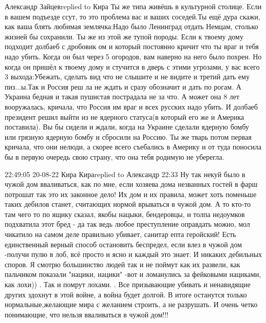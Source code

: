 Александр Зайцевreplied to Кира
Ты же типа живёшь в культурной столице. Если в вашем подъезде ссут, то это проблема вас и ваших соседей.Ты ещё дура скажи, как ваша блять любимая землячка:Надо было Ленинград отдать Немцам, столько жизней бы сохранили. Ты же из этой же тупой породы. Если к твоему дому подходит долбаеб с дробовик ом и который постоянно кричит что ты враг и тебя надо убить. Когда он был через 5 огородов, вам наверно на него было похрен. Но когда он пришёл к твоему дому и стучится в дверь с этими угрозами, у вас всего 3 выхода:Убежать, сделать вид что не слышите и не видите и третий дать ему пиз...ы.Так и Россия реш ла не ждать и сразу обозначит и дать по рогам. А Украина бедная и такая пушистая пострадала не за что. А может она 8 лет вооружалась, кричала, что Россия им враг и всех русских надо убить. И долбаеб президент решил выйти из не ядерного статуса(в который его же и Америка поставила). Вы бы сидели и ждали, когда на Украине сделали ядерную бомбу или грязную ядерную бомбу и сбросили на Россию. Ты же тварь потом первая кричала, что они нелюди, а скорее всего съебались в Америку и от туда поносила бы в первую очередь свою страну, что она тебя родимую не уберегла.


22:49:05 20-08-22
Кира Кираreplied to Александр
22:33
Ну так некуй было в чужой дом вваливаться, как по мне, если хозяева дома незванных гостей в фарш потрошат так это их законное дело!
Их дом и их правила, может хоть поменьше таких дебилов станет, считающих нормой врываться в чужой дом. А то кто-то там чего то по ящику сказал, якобы нацыки, бендеровцы, и толпа недоумков подхватила этот бред - да так ведь любое преступление оправдать можно, мол чикатило на самом деле правильно убивает, санитар епта геройский! Есть единственный верный способ остановить беспредел, если влез в чужой дом -получи пулю в лоб, всё просто и ясно и каждый это знает. И никаких дебильных споров. Я смотрю большинство людей так и не поймут как их развели, как пальчиком показали "нацики, нацики" -вот и ломанулись за фейковыми нациками, как лохи)) . Так и помрут лохами.
. Все призывающие убивать и ненавидящие других здохнут в этой войне, а война будет долгой. В итоге останутся только нормальные,желающие мира с желанием строить, а не разрушать. И очень четко понимающие, что нельзя вваливаться в чужой дом!!!


